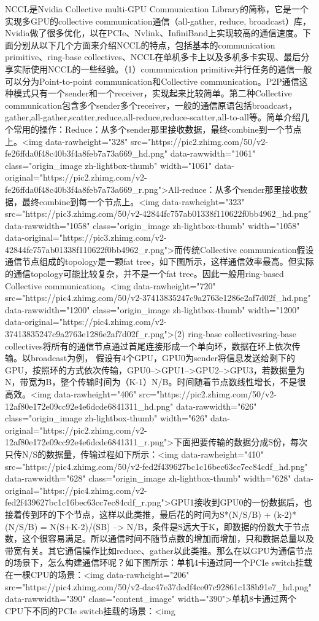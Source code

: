 NCCL是Nvidia Collective multi-GPU Communication Library的简称，它是一个实现多GPU的collective communication通信（all-gather, reduce, broadcast）库，Nvidia做了很多优化，以在PCIe、Nvlink、InfiniBand上实现较高的通信速度。下面分别从以下几个方面来介绍NCCL的特点，包括基本的communication primitive、ring-base collectives、NCCL在单机多卡上以及多机多卡实现、最后分享实际使用NCCL的一些经验。（1）communication primitive并行任务的通信一般可以分为Point-to-point communication和Collective communication。P2P通信这种模式只有一个sender和一个receiver，实现起来比较简单。第二种Collective communication包含多个sender多个receiver，一般的通信原语包括broadcast，gather,all-gather,scatter,reduce,all-reduce,reduce-scatter,all-to-all等。简单介绍几个常用的操作：Reduce：从多个sender那里接收数据，最终combine到一个节点上。<img data-rawheight="328" src="https://pic2.zhimg.com/50/v2-fe26ffda0f48c40b3f4a8feb7a73a669_hd.png" data-rawwidth="1061" class="origin_image zh-lightbox-thumb" width="1061" data-original="https://pic2.zhimg.com/v2-fe26ffda0f48c40b3f4a8feb7a73a669_r.png">All-reduce：从多个sender那里接收数据，最终combine到每一个节点上。<img data-rawheight="323" src="https://pic3.zhimg.com/50/v2-42844fc757ab01338f110622f0bb4962_hd.png" data-rawwidth="1058" class="origin_image zh-lightbox-thumb" width="1058" data-original="https://pic3.zhimg.com/v2-42844fc757ab01338f110622f0bb4962_r.png">而传统Collective communication假设通信节点组成的topology是一颗fat tree，如下图所示，这样通信效率最高。但实际的通信topology可能比较复杂，并不是一个fat tree。因此一般用ring-based Collective communication。<img data-rawheight="720" src="https://pic4.zhimg.com/50/v2-37413835247c9a2763e1286e2af7d02f_hd.png" data-rawwidth="1200" class="origin_image zh-lightbox-thumb" width="1200" data-original="https://pic4.zhimg.com/v2-37413835247c9a2763e1286e2af7d02f_r.png">(2) ring-base collectivesring-base collectives将所有的通信节点通过首尾连接形成一个单向环，数据在环上依次传输。以broadcast为例， 假设有4个GPU，GPU0为sender将信息发送给剩下的GPU，按照环的方式依次传输，GPU0-->GPU1-->GPU2-->GPU3，若数据量为N，带宽为B，整个传输时间为（K-1）N/B。时间随着节点数线性增长，不是很高效。<img data-rawheight="406" src="https://pic2.zhimg.com/50/v2-12af80e172e09cc92e4e6dcde6841311_hd.png" data-rawwidth="626" class="origin_image zh-lightbox-thumb" width="626" data-original="https://pic2.zhimg.com/v2-12af80e172e09cc92e4e6dcde6841311_r.png">下面把要传输的数据分成S份，每次只传N/S的数据量，传输过程如下所示：<img data-rawheight="410" src="https://pic4.zhimg.com/50/v2-fed2f439627bc1c16bec63cc7ec84cdf_hd.png" data-rawwidth="628" class="origin_image zh-lightbox-thumb" width="628" data-original="https://pic4.zhimg.com/v2-fed2f439627bc1c16bec63cc7ec84cdf_r.png">GPU1接收到GPU0的一份数据后，也接着传到环的下个节点，这样以此类推，最后花的时间为S*(N/S/B) + (k-2)*(N/S/B) = N(S+K-2)/(SB) --> N/B，条件是S远大于K，即数据的份数大于节点数，这个很容易满足。所以通信时间不随节点数的增加而增加，只和数据总量以及带宽有关。其它通信操作比如reduce、gather以此类推。那么在以GPU为通信节点的场景下，怎么构建通信环呢？如下图所示：单机4卡通过同一个PCIe switch挂载在一棵CPU的场景：<img data-rawheight="206" src="https://pic4.zhimg.com/50/v2-dac47e37dedf4ce07c92861c138b91e7_hd.png" data-rawwidth="390" class="content_image" width="390">单机8卡通过两个CPU下不同的PCIe switch挂载的场景：<img 